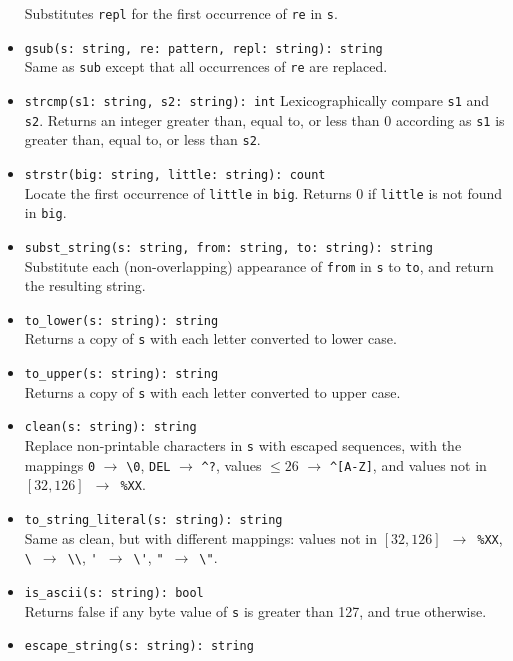 \documentclass[10pt,landscape]{article}
\begin{document}
\begin{multicols*}{2}
\begin{itemize}
    Substitutes \texttt{repl} for the first occurrence of \texttt{re} in
    \texttt{s}.
  \item \verb|gsub(s: string, re: pattern, repl: string): string|\\
    Same as \texttt{sub} except that all occurrences of \texttt{re} are
    replaced.
  \item \verb|strcmp(s1: string, s2: string): int|
    Lexicographically compare \texttt{s1} and \texttt{s2}. Returns an integer
    greater than, equal to, or less than 0 according as \texttt{s1} is greater
    than, equal to, or less than \texttt{s2}.
  \item \verb|strstr(big: string, little: string): count|\\
    Locate the first occurrence of \texttt{little} in \texttt{big}.
    Returns 0 if \texttt{little} is not found in \texttt{big}.
  \item \verb|subst_string(s: string, from: string, to: string): string|\\
    Substitute each (non-overlapping) appearance of \texttt{from} in
    \texttt{s} to \texttt{to}, and return the resulting string.
  \item \verb|to_lower(s: string): string|\\
    Returns a copy of \texttt{s} with each letter converted to lower case.
  \item \verb|to_upper(s: string): string|\\
    Returns a copy of \texttt{s} with each letter converted to upper case.
  \item \verb|clean(s: string): string|\\
    Replace non-printable characters in \texttt{s} with escaped sequences,
    with the mappings
    \verb|0| $\rightarrow$ \verb|\0|,
    \verb|DEL| $\rightarrow$ \verb|^?|,
    values $\le 26$ $\rightarrow$ \verb|^[A-Z]|,
    and values not in $[32, 126]$~$\rightarrow$~\verb|%XX|.
  \item \verb|to_string_literal(s: string): string|\\
    Same as clean, but with different mappings:
    values not in $[32, 126]$~$\rightarrow$~\verb|%XX|,
    \verb|\|~$\rightarrow$~\verb|\\|,
    \verb|'|~$\rightarrow$~\verb|\'|,
    \verb|"|~$\rightarrow$~\verb|\"|.
  \item \verb|is_ascii(s: string): bool|\\
    Returns false if any byte value of \texttt{s} is greater than 127, and true
    otherwise.
  \item \verb|escape_string(s: string): string|\\

\end{itemize}
\end{multicols*}
\end{document}
